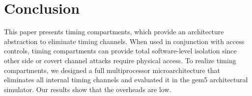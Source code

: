 \section{Conclusion}
This paper presents timing compartments, which provide an architecture 
abstraction to eliminate timing channels. When used in conjunction with access 
controls, timing compartments can provide total software-level isolation since 
other side or covert channel attacks require physical access. To realize 
timing compartments, we designed a full multiprocessor microarchitecture 
that eliminates all internal timing channels and evaluated it in the gem5 
architectural simulator. Our results show that the overheads are low.
